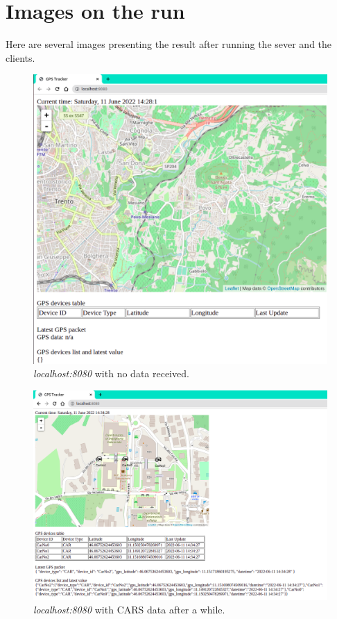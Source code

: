 \documentclass{article}
\begin{document}
\section{Images on the run}
Here are several images presenting the result after running the sever and the clients.
\begin{figure}[H]
\centering
  \includegraphics[width=1\textwidth]{fig/server.png}
  \caption{\textit{localhost:8080} with no data received.}
  \label{fig:server}
\end{figure}

\begin{figure}[H]
\centering
  \includegraphics[width=1\textwidth]{fig/cars.png}
  \caption{\textit{localhost:8080} with CARS data after a while.}
  \label{fig:server}
\end{figure}
\end{document}
